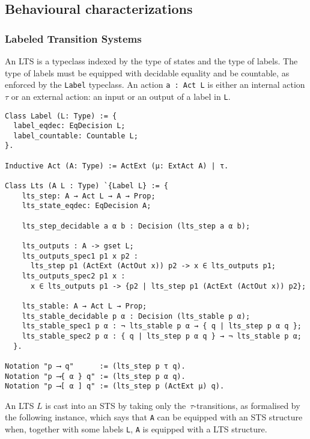 \subsection{Behavioural characterizations}

\subsubsection{Labeled Transition Systems}

An LTS is a typeclass indexed by the type of states and the type of labels. The
type of labels must be equipped with decidable equality and be countable, as
enforced by the \lstinline|Label| typeclass.
%
An action \lstinline|a : Act L| is either an internal action $\tau$ or an external
action: an input or an output of a label in \lstinline|L|.

\begin{mdframed}
\begin{verbatim}
Class Label (L: Type) := {
  label_eqdec: EqDecision L;
  label_countable: Countable L;
}.

Inductive Act (A: Type) := ActExt (μ: ExtAct A) | τ.

Class Lts (A L : Type) `{Label L} := {
    lts_step: A → Act L → A → Prop;
    lts_state_eqdec: EqDecision A;

    lts_step_decidable a α b : Decision (lts_step a α b);

    lts_outputs : A -> gset L;
    lts_outputs_spec1 p1 x p2 :
      lts_step p1 (ActExt (ActOut x)) p2 -> x ∈ lts_outputs p1;
    lts_outputs_spec2 p1 x :
      x ∈ lts_outputs p1 -> {p2 | lts_step p1 (ActExt (ActOut x)) p2};

    lts_stable: A → Act L → Prop;
    lts_stable_decidable p α : Decision (lts_stable p α);
    lts_stable_spec1 p α : ¬ lts_stable p α → { q | lts_step p α q };
    lts_stable_spec2 p α : { q | lts_step p α q } → ¬ lts_stable p α;
  }.

Notation "p ⟶ q"      := (lts_step p τ q).
Notation "p ⟶{ α } q" := (lts_step p α q).
Notation "p ⟶[ α ] q" := (lts_step p (ActExt μ) q).
\end{verbatim}
\end{mdframed}

An LTS $L$ is cast into an STS by taking only the~$\tau$-transitions, as
formalised by the following instance, which says that \lstinline|A| can be
equipped with an STS structure when, together with some labels \lstinline|L|,
\lstinline|A| is equipped with a LTS structure.

